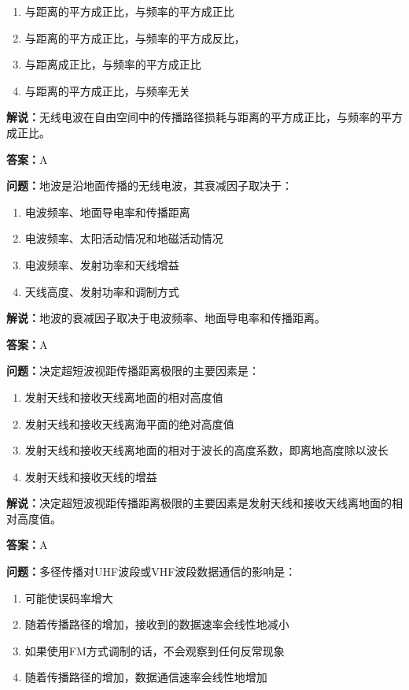 \documentclass[UTF8]{ctexbook}
\begin{document}
\begin{enumerate}[label=\Alph*), leftmargin=3em]
  \item 与距离的平方成正比，与频率的平方成正比
  \item 与距离的平方成正比，与频率的平方成反比，
  \item 与距离成正比，与频率的平方成正比
  \item 与距离的平方成正比，与频率无关
\end{enumerate}

\textbf{解说：}无线电波在自由空间中的传播路径损耗与距离的平方成正比，与频率的平方成正比。%

\textbf{答案：}A

\textbf{问题：}地波是沿地面传播的无线电波，其衰减因子取决于：

\begin{enumerate}[label=\Alph*), leftmargin=3em]
  \item 电波频率、地面导电率和传播距离
  \item 电波频率、太阳活动情况和地磁活动情况
  \item 电波频率、发射功率和天线增益
  \item 天线高度、发射功率和调制方式
\end{enumerate}

\textbf{解说：}地波的衰减因子取决于电波频率、地面导电率和传播距离。%

\textbf{答案：}A

\textbf{问题：}决定超短波视距传播距离极限的主要因素是：

\begin{enumerate}[label=\Alph*), leftmargin=3em]
  \item 发射天线和接收天线离地面的相对高度值
  \item 发射天线和接收天线离海平面的绝对高度值
  \item 发射天线和接收天线离地面的相对于波长的高度系数，即离地高度除以波长
  \item 发射天线和接收天线的增益
\end{enumerate}

\textbf{解说：}决定超短波视距传播距离极限的主要因素是发射天线和接收天线离地面的相对高度值。%

\textbf{答案：}A

\textbf{问题：}多径传播对UHF波段或VHF波段数据通信的影响是：

\begin{enumerate}[label=\Alph*), leftmargin=3em]
  \item 可能使误码率增大
  \item 随着传播路径的增加，接收到的数据速率会线性地减小
  \item 如果使用FM方式调制的话，不会观察到任何反常现象
  \item 随着传播路径的增加，数据通信速率会线性地增加
\end{enumerate}
\end{document}
